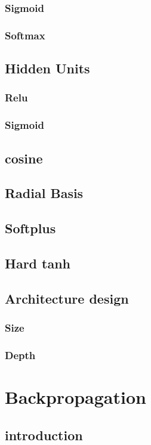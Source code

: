 \documentclass[a4paper,10pt,titlepage]{report}
\begin{document}
\subsubsection{Sigmoid}
\subsubsection{Softmax}


\subsection{Hidden Units}
\subsubsection{Relu}
\subsubsection{Sigmoid}
\subsection{cosine}
\subsection{Radial Basis}
\subsection{Softplus}
\subsection{Hard tanh}

\subsection{Architecture design}
\subsubsection{Size}
\subsubsection{Depth}


\newpage
\section{Backpropagation}

\subsection{introduction}
\end{document}
